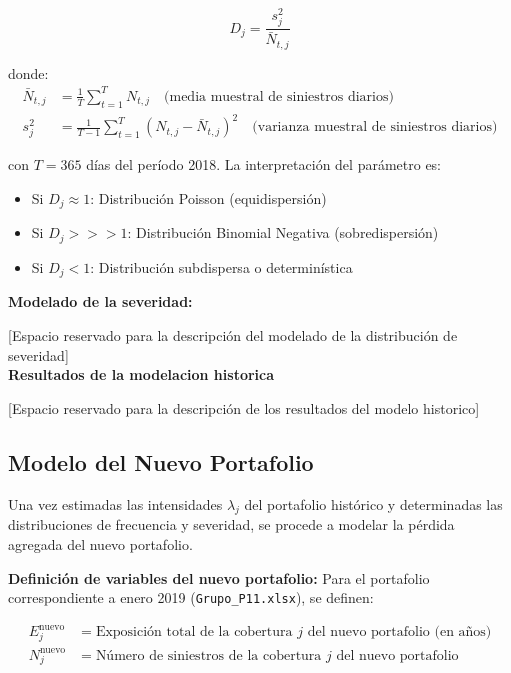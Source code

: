\begin{equation*}
D_j = \frac{s_j^2}{\bar{N}_{t,j}}
\end{equation*}

donde:
\begin{align*}
\bar{N}_{t,j} &= \frac{1}{T} \sum_{t=1}^{T} N_{t,j} \quad \text{(media muestral de siniestros diarios)} \\
s_j^2 &= \frac{1}{T-1} \sum_{t=1}^{T} (N_{t,j} - \bar{N}_{t,j})^2 \quad \text{(varianza muestral de siniestros diarios)}
\end{align*}

con $T = 365$ días del período 2018. La interpretación del parámetro es:

\begin{itemize}
    \item Si $D_j \approx 1$: Distribución Poisson (equidispersión)
    \item Si $D_j >>> 1$: Distribución Binomial Negativa (sobredispersión)
    \item Si $D_j < 1$: Distribución subdispersa o determinística
\end{itemize}

\textbf{Modelado de la severidad:}

[Espacio reservado para la descripción del modelado de la distribución de severidad]\\

\textbf{Resultados de la modelacion historica}

[Espacio reservado para la descripción de los resultados del modelo historico]

\subsection{Modelo del Nuevo Portafolio}

Una vez estimadas las intensidades $\lambda_j$ del portafolio histórico y determinadas las distribuciones de frecuencia y severidad, se procede a modelar la pérdida agregada del nuevo portafolio.

\textbf{Definición de variables del nuevo portafolio:} Para el portafolio correspondiente a enero 2019 (\texttt{Grupo\_P11.xlsx}), se definen:

\begin{align*}
E_j^{\text{nuevo}} &= \text{Exposición total de la cobertura } j \text{ del nuevo portafolio (en años)} \\
N_j^{\text{nuevo}} &= \text{Número de siniestros de la cobertura } j \text{ del nuevo portafolio}
\end{align*}

